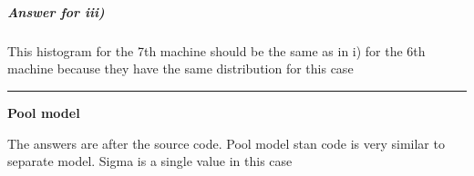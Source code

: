\documentclass[11pt]{article}
\begin{document}
    \begin{center}
    \end{center}
    { \hspace*{\fill} \\}
    
    \begin{center}
    \end{center}
    { \hspace*{\fill} \\}
    
    \hypertarget{answer-for-iii}{%
\subparagraph{Answer for iii)}\label{answer-for-iii}}

This histogram for the 7th machine should be the same as in i) for the
6th machine because they have the same distribution for this case

    \begin{center}\rule{0.5\linewidth}{\linethickness}\end{center}

\textbf{Pool model}

    The answers are after the source code. Pool model stan code is very
similar to separate model. Sigma is a single value in this case
\end{document}
